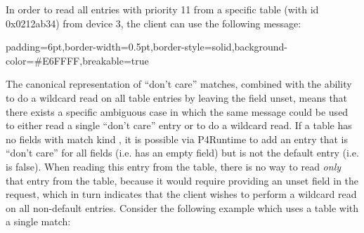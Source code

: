 \documentclass[11pt]{article}
\begin{document}
{%
\noindent{}In order to read all entries with priority 11 from a specific table (with id
0x0212ab34) from device 3, the client can use the following 
message:%

\begin{mdbmargintb}{6pt}{6pt}%
\begin{mdblock}{padding=6pt,border-width=0.5pt,border-style=solid,background-color=\#E6FFFF,breakable=true}%
\begin{mdpre}%
\end{mdpre}%
\end{mdblock}%
\end{mdbmargintb}%

\noindent{}The canonical representation of \textquotedblleft{}don't care\textquotedblright{} matches, combined with the ability
to do a wildcard read on all table entries by leaving the  field unset,
means that there exists a specific ambiguous case in which the same message
could be used to either read a single \textquotedblleft{}don't care\textquotedblright{} entry or to do a wildcard
read. If a table has no fields with match kind , it is possible via
P4Runtime to add an entry that is \textquotedblleft{}don't care\textquotedblright{} for all fields (i.e. has an empty
 field) but is not the default entry (i.e.  is
false). When reading this entry from the table, there is no way to read \emph{only}
that entry from the table, because it would require providing an unset 
field in the request, which in turn indicates that the client wishes to perform
a wildcard read on all non-default entries. Consider the following example which
uses a table with a single  match:%

}
\end{document}
